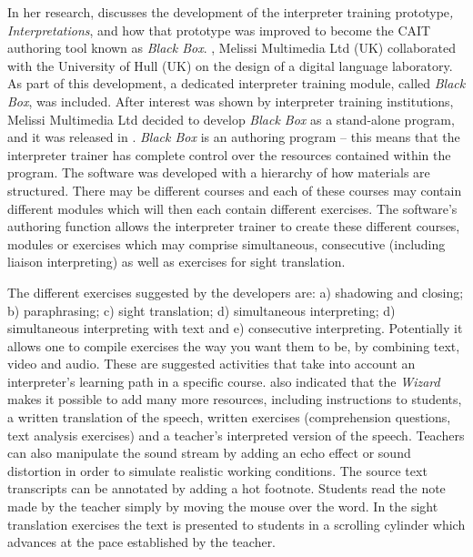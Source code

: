 \documentclass[output=paper]{langsci/langscibook}
\begin{document}
In her research, \citet{Sandrelli2007} discusses the development of the interpreter training prototype\textit{, Interpretations}, and how that prototype was improved to become the CAIT authoring tool known as \textit{Black Box}. \citealt{In2002}, Melissi Multimedia Ltd (UK) collaborated with the University of Hull (UK) on the design of a digital language laboratory. As part of this development, a dedicated interpreter training module, called \textit{Black Box}, was included. After interest was shown by interpreter training institutions, Melissi Multimedia Ltd decided to develop \textit{Black Box} as a stand-alone program, and it was released in \citealt{March2005}. \textit{Black Box} is an authoring program – this means that the interpreter trainer has complete control over the resources contained within the program. The software was developed with a hierarchy of how materials are structured. There may be different courses and each of these courses may contain different modules which will then each contain different exercises. The software’s authoring function allows the interpreter trainer to create these different courses, modules or exercises which may comprise simultaneous, consecutive (including liaison interpreting) as well as exercises for sight translation. 

The different exercises suggested by the developers are: a) shadowing and closing; b) paraphrasing; c) sight translation; d) simultaneous interpreting; d) simultaneous interpreting with text and e) consecutive interpreting. Potentially it allows one to compile exercises the way you want them to be, by combining text, video and audio. These are suggested activities that take into account an interpreter’s learning path in a specific course. \citet[10]{Sandrelli2007} also indicated that the \textit{Wizard} makes it possible to add many more resources, including instructions to students, a written translation of the speech, written exercises (comprehension questions, text analysis exercises) and a teacher’s interpreted version of the speech. Teachers can also manipulate the sound stream by adding an echo effect or sound distortion in order to simulate realistic working conditions. The source text transcripts can be annotated by adding a hot footnote. Students read the note made by the teacher simply by moving the mouse over the word. In the sight translation exercises the text is presented to students in a scrolling cylinder which advances at the pace established by the teacher. 
\end{document}
